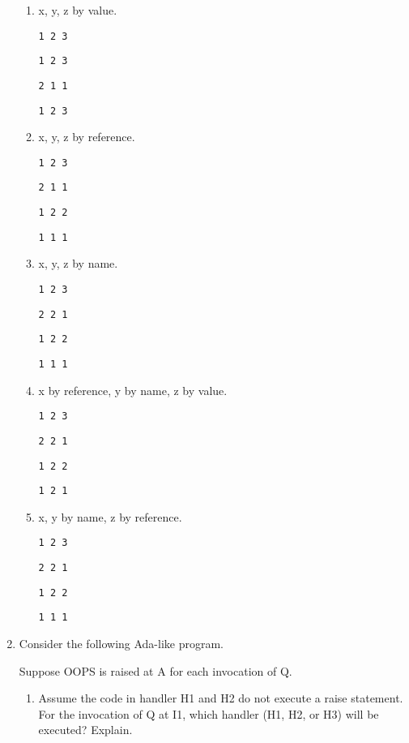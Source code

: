 \documentclass[12pt,letterpaper]{article}
\begin{document}
\begin{enumerate}
      \begin{enumerate}
        \item x, y, z by value.

          \texttt{1 2 3}

          \texttt{1 2 3}

          \texttt{2 1 1}

          \texttt{1 2 3}

        \item x, y, z by reference.

          \texttt{1 2 3}

          \texttt{2 1 1}

          \texttt{1 2 2}

          \texttt{1 1 1}

        \item x, y, z by name.

          \texttt{1 2 3}

          \texttt{2 2 1}

          \texttt{1 2 2}

          \texttt{1 1 1}

        \item x by reference, y by name, z by value.

          \texttt{1 2 3}

          \texttt{2 2 1}

          \texttt{1 2 2}

          \texttt{1 2 1}

        \item x, y by name, z by reference.

          \texttt{1 2 3}

          \texttt{2 2 1}

          \texttt{1 2 2}

          \texttt{1 1 1}
      \end{enumerate}

      \item
        Consider the following Ada-like program.

        Suppose OOPS is raised at A for each invocation of Q.

        \begin{enumerate}
          \item
            Assume the code in handler H1 and H2 do not execute a raise statement.
            For the invocation of Q at I1, which handler (H1, H2, or H3) will be executed? Explain.


\end{enumerate}
\end{enumerate}
\end{document}

